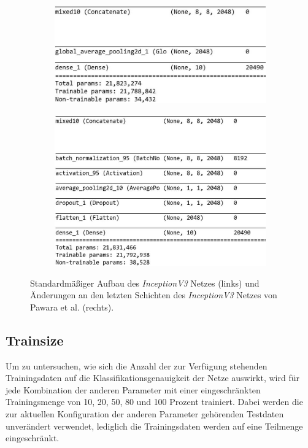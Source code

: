 \begin{figure}[H]

\begin{subfigure}{0.48\textwidth}
\includegraphics[width=\textwidth]{img/3_inception-standard.jpg}
\end{subfigure}
\hfill
\begin{subfigure}{0.48\textwidth}
\includegraphics[width=\textwidth]{img/3_inception-pawara.jpg}
\end{subfigure}



\caption{Standardmäßiger Aufbau des \textit{InceptionV3} Netzes (links) und Änderungen an den letzten Schichten des \textit{InceptionV3} Netzes von Pawara et al. \cite{pawaraWebsiteCode, pawaraPaper} (rechts).}
\label{fig:inceptionAenderungen}
\end{figure}


\subsection{Trainsize}
\label{ch:methodik_trainsize}
Um zu untersuchen, wie sich die Anzahl der zur Verfügung stehenden Trainingsdaten auf die Klassifikationsgenauigkeit der Netze auswirkt, wird für jede Kombination der anderen Parameter mit einer eingeschränkten Trainingsmenge von 10, 20, 50, 80 und 100 Prozent trainiert. Dabei werden die zur aktuellen Konfiguration der anderen Parameter gehörenden Testdaten unverändert verwendet, lediglich die Trainingsdaten werden auf eine Teilmenge eingeschränkt.\\

